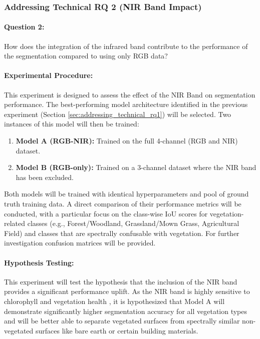\documentclass{report}
\begin{document}
\subsubsection{Addressing Technical RQ 2 (NIR Band Impact)}
\label{sec:addressing_technical_rq2}
\paragraph{Question 2:} How does the integration of the infrared band contribute to the performance of the segmentation compared to using only RGB data?
\paragraph{Experimental Procedure:} This experiment is designed to assess the effect of the NIR Band on segmentation performance. The best-performing model architecture identified in the previous experiment (Section \ref{sec:addressing_technical_rq1}) will be selected. Two instances of this model will then be trained:
\begin{enumerate}
\item \textbf{Model A (RGB-NIR):} Trained on the full 4-channel (RGB and NIR) dataset.
\item \textbf{Model B (RGB-only):} Trained on a 3-channel dataset where the NIR band has been excluded.
\end{enumerate}
Both models will be trained with identical hyperparameters and pool of ground truth training data. A direct comparison of their performance metrics will be conducted, with a particular focus on the class-wise IoU scores for vegetation-related classes (e.g., Forest/Woodland, Grassland/Mown Grass, Agricultural Field) and classes that are spectrally confusable with vegetation. For further investigation confusion matrices will be provided.
\paragraph{Hypothesis Testing:} This experiment will test the hypothesis that the inclusion of the NIR band provides a significant performance uplift. As the NIR band is highly sensitive to chlorophyll and vegetation health \parencite[p.~180ff.]{LuoEtAlSemanticsegmentationagriculturalimagessurvey2024}, it is hypothesized that Model A will demonstrate significantly higher segmentation accuracy for all vegetation types and will be better able to separate vegetated surfaces from spectrally similar non-vegetated surfaces like bare earth or certain building materials.
\end{document}
